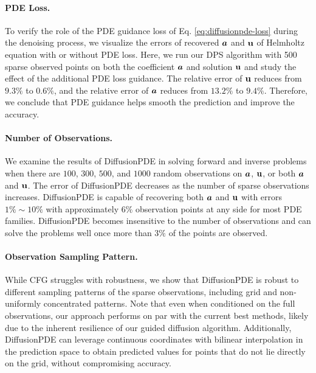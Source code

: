 \paragraph{PDE Loss.} 

\vspace{-0.5em}
To verify the role of the PDE guidance loss of Eq. \ref{eq:diffusionpde-loss} during the denoising process, we visualize the errors of recovered $\boldsymbol{a}$ and $\mathbf{u}$ of Helmholtz equation with or without PDE loss. Here, we run our DPS algorithm with 500 sparse observed points on both the coefficient $\boldsymbol{a}$ and solution $\mathbf{u}$ and study the effect of the additional PDE loss guidance. The relative error of $\mathbf{u}$ reduces from $9.3\%$ to $0.6\%$, and the relative error of $\boldsymbol{a}$ reduces from $13.2\%$ to $9.4\%$. Therefore, we conclude that PDE guidance helps smooth the prediction and improve the accuracy.

\vspace{-0.5em}
\paragraph{Number of Observations.} We examine the results of DiffusionPDE in solving forward and inverse problems when there are $100$, $300$, $500$, and $1000$ random observations on $\boldsymbol{a}$, $\mathbf{u}$, or both $\boldsymbol{a}$ and $\mathbf{u}$. The error of DiffusionPDE decreases as the number of sparse observations increases. DiffusionPDE is capable of recovering both $\boldsymbol{a}$ and $\mathbf{u}$ with errors $1\% \sim 10\%$ with approximately $6\%$ observation points at any side for most PDE families. DiffusionPDE becomes insensitive to the number of observations and can solve the problems well once more than $3\%$ of the points are observed. 

\vspace{-0.5em}
\paragraph{Observation Sampling Pattern.} While CFG struggles with robustness, we show that DiffusionPDE is robust to different sampling patterns of the sparse observations, including grid and non-uniformly concentrated patterns. Note that even when conditioned on the full observations, our approach performs on par with the current best methods, likely due to the inherent resilience of our guided diffusion algorithm. Additionally, DiffusionPDE can leverage continuous coordinates with bilinear interpolation in the prediction space to obtain predicted values for points that do not lie directly on the grid, without compromising accuracy.

